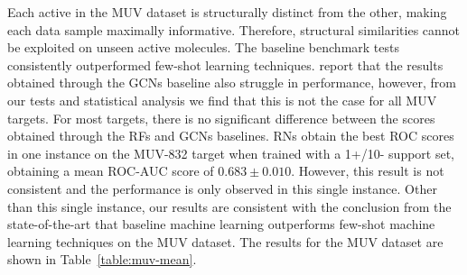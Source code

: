 Each active in the MUV dataset is structurally distinct from the other, making each data sample maximally informative. Therefore, structural similarities cannot be exploited on unseen active molecules. The baseline benchmark tests consistently outperformed few-shot learning techniques. \citet{altae2017low} report that the results obtained through the GCNs baseline also struggle in performance, however, from our tests and statistical analysis we find that this is not the case for all MUV targets. For most targets, there is no significant difference between the scores obtained through the RFs and GCNs baselines. RNs obtain the best ROC scores in one instance on the MUV-832 target when trained with a 1+/10- support set, obtaining a mean ROC-AUC score of $0.683 \pm 0.010$. However, this result is not consistent and the performance is only observed in this single instance. Other than this single instance, our results are consistent with the conclusion from the state-of-the-art that baseline machine learning outperforms few-shot machine learning techniques on the MUV dataset. The results for the MUV dataset are shown in Table~\ref{table:muv-mean}.

